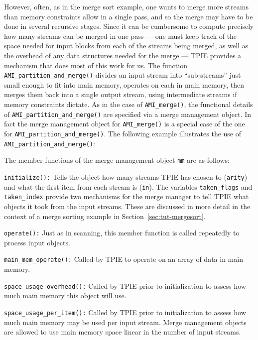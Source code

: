  However, often, as in the merge sort example, one wants to merge more
 streams than memory constraints allow in a single pass, and so the
 merge may have to be done in several recursive stages.    Since it can be
 cumbersome to compute precisely how many streams can be merged in one
 pass --- one must keep track of the space needed for input blocks
 from each of the streams being merged, as well as the overhead of any
 data structures needed for the merge --- TPIE provides a mechanism
 that does most of this work for us. The function
 \lstinline|AMI_partition_and_merge()| divides an input stream into
 ``sub-streams'' just small enough to fit into main memory, operates
 on each in main memory, then merges them back into a single output
 stream, using intermediate streams if memory constraints dictate. As
 in the case of \lstinline|AMI_merge()|, the functional details of
 \lstinline|AMI_partition_and_merge()| are specified via a merge
 management object. In fact the merge management object for
 \lstinline|AMI_merge()| is a special case of the one for
 \lstinline|AMI_partition_and_merge()|. The
 following example illustrates the use of
 \lstinline|AMI_partition_and_merge()|:



The member functions of the merge management object
\lstinline|mm| are as follows:

\begin{description}
\item\lstinline|initialize():| Tells the object how many streams TPIE
  has chosen to (\lstinline|arity|) and what the first item
  from each stream is (\lstinline|in|). The variables
  \lstinline|taken_flags| and \lstinline|taken_index| provide two
  mechanisms for the merge manager to tell TPIE what objects it took
  from the input streams. These are discussed in more detail in the
  context of a merge sorting example in
  Section~\ref{sec:tut-mergesort}.
    \item\lstinline|operate():| Just as in scanning, this
    member function is called repeatedly to process input
    objects.
    \item\lstinline|main_mem_operate():| Called by TPIE to
    operate on an array of data in main memory.
    \item\lstinline|space_usage_overhead():| Called by TPIE
    prior to initialization to assess how much main memory
    this object will use.
    \item\lstinline|space_usage_per_item():| Called by TPIE
    prior to initialization to assess how much main memory
    may be used per input stream. Merge management objects
    are allowed to use main memory space linear in the
    number of input streams.
\end{description}

